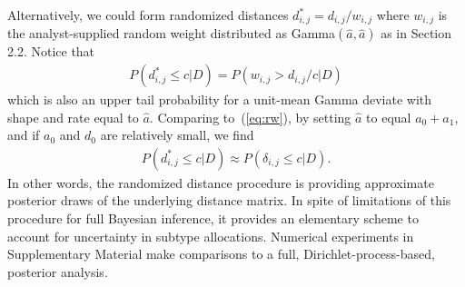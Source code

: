 \documentclass[aoas,preprint]{imsart}
\begin{document}
Alternatively, we could form randomized distances $d^*_{i,j} = d_{i,j}/w_{i,j}$ where $w_{i,j}$ is 
the analyst-supplied random weight distributed as Gamma$(\hat a , \hat a)$ as in Section 2.2.  Notice
that 
\begin{eqnarray*}
P( d_{i,j}^* \leq c | D )  = P( w_{i,j} > d_{i,j}/c | D)
\end{eqnarray*}
which is also an upper tail probability for a unit-mean Gamma deviate with shape and rate equal to $\hat a$.  
Comparing to~(\ref{eq:rw}),  by setting  $\hat a$ to equal $a_0 + a_1$, and if $a_0$ and $d_0$ are relatively
small, we find
\begin{eqnarray*}
P( d_{i,j}^* \leq c | D )  \approx  P( \delta_{i,j} \leq c | D).
\end{eqnarray*}
In other words, the randomized distance procedure is providing approximate posterior draws of the underlying
distance matrix.  In spite of limitations of this procedure for full Bayesian inference, it provides
an elementary scheme to account for uncertainty in subtype allocations.  Numerical experiments
in Supplementary Material make comparisons to a full, Dirichlet-process-based, posterior analysis.


%

\end{document}
